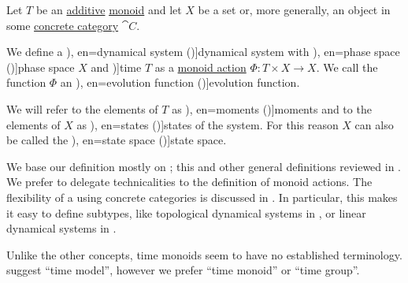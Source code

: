 \begin{definition}\label{def:dynamical_system}\mimprovised
  Let \( T \) be an \hyperref[con:additive_semigroup]{additive} \hyperref[def:monoid]{monoid} and let \( X \) be a set or, more generally, an object in some \hyperref[def:concrete_category]{concrete category} \( \cat{C} \).

  We define a \term[ru=динамическая система (\cite[5]{Юмагулов2015ДинамическиеСистемы}), en=dynamical system (\cite[362]{Rozikov2012MultiDimensionalTimeDynamicalSystem})]{dynamical system} with \term[ru=фазовое пространство (\cite[5]{Юмагулов2015ДинамическиеСистемы}), en=phase space (\cite[362]{Rozikov2012MultiDimensionalTimeDynamicalSystem})]{phase space} \( X \) and \term[en=time (\cite[1]{HasselblattKatok1995DynamicalSystems})]{time} \( T \) as a \hyperref[def:monoid_action]{monoid action} \( \Phi: T \times X \to X \). We call the function \( \Phi \) an \term[ru=оператор эволюции (\cite[5]{Юмагулов2015ДинамическиеСистемы}), en=evolution function (\cite[362]{Rozikov2012MultiDimensionalTimeDynamicalSystem})]{evolution function}.

  We will refer to the elements of \( T \) as \term[ru=моменты (\cite[5]{Юмагулов2015ДинамическиеСистемы}), en=moments (\cite[2]{HasselblattKatok1995DynamicalSystems})]{moments} and to the elements of \( X \) as \term[ru=состояния (\cite[5]{Юмагулов2015ДинамическиеСистемы}), en=states (\cite[2]{HasselblattKatok1995DynamicalSystems})]{states} of the system. For this reason \( X \) can also be called the \term[ru=пространство состояний (\cite[5]{Юмагулов2015ДинамическиеСистемы}), en=state space (\cite[362]{Rozikov2012MultiDimensionalTimeDynamicalSystem})]{state space}.
\end{definition}
\begin{comments}
  \item We base our definition mostly on ; this and other general definitions reviewed in . We prefer to delegate technicalities to the definition  of monoid actions. The flexibility of a using concrete categories is discussed in . In particular, this makes it easy to define subtypes, like topological dynamical systems in , or linear dynamical systems in .

  \item Unlike the other concepts, time monoids seem to have no established terminology.  suggest \enquote{time model}, however we prefer \enquote{time monoid} or \enquote{time group}.
\end{comments}

